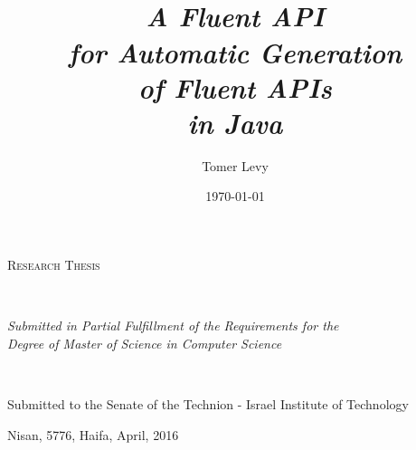 \title{%
  \Huge \Fajita \\
  \Large\itshape A Fluent API \\
  \Large\itshape for Automatic Generation\\
  \Large\itshape of Fluent APIs \\
  \Large\itshape in Java}
\author{Tomer Levy}
\date{\today}



\begin{titlepage}

	\centering
	\vspace*{4cm}
	{\huge
	    \makeatletter \@title \makeatother \par
	}
	\vfill
	{\scshape\Large Research Thesis\par}
  \mbox{}\\
	{\small \itshape Submitted in Partial Fulfillment of the Requirements for the\\ Degree of Master of Science in Computer Science\par}
	\vspace{2cm}
	{\Large\itshape 
		\makeatletter \@author \makeatother \\ 
	}
	\vfill
	
	{
        Submitted to the Senate of the Technion - Israel Institute of Technology\par
        Nisan, 5776,  Haifa,   April, 2016
	}
\end{titlepage}
